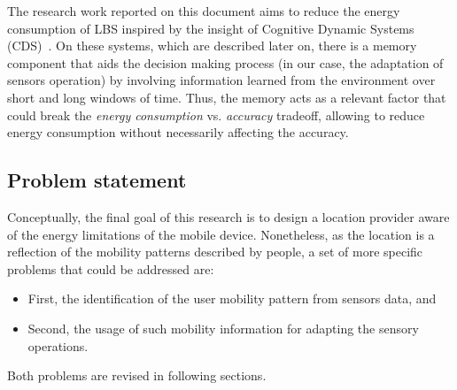 \documentclass[ENG,PhD]{cinvestav}
\begin{document}
The research work reported on this document aims to reduce the energy consumption of LBS inspired by the insight of Cognitive Dynamic Systems (CDS)~\cite{Haykin2006}.
On these systems, which are described later on, there is a memory component that aids the decision making process (in our case, the adaptation of sensors operation) by involving information learned from the environment over short and long windows of time.
Thus, the memory acts as a relevant factor that could break the \emph{energy consumption} vs. \emph{accuracy} tradeoff, allowing to reduce energy consumption without necessarily affecting the accuracy.


\subsection{Problem statement}
\label{sub:problem-statement}
Conceptually, the final goal of this research is to design a location provider aware of the energy limitations of the mobile device.
Nonetheless, as the location is a reflection of the mobility patterns described by people, a set of more specific problems that could be addressed are:
\begin{itemize}
  \item First, the identification of the user mobility pattern from sensors data, and
  \item Second, the usage of such mobility information for adapting the sensory operations.
\end{itemize}

Both problems are revised in following sections.
\end{document}
